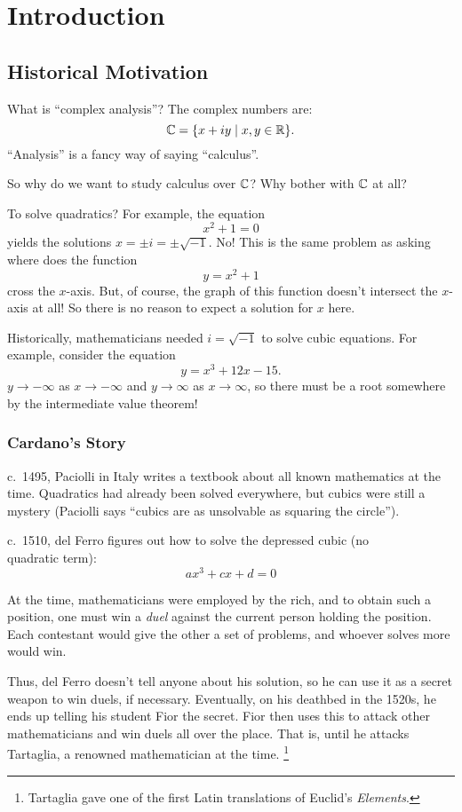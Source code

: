\chapter{Introduction}
\section{Historical Motivation}
What is ``complex analysis''? The complex numbers are:
\[
  \mathbb{C} = \{x + iy \mid x, y \in \mathbb{R}\}
.\] 
``Analysis'' is a fancy way of saying ``calculus''.

So why do we want to study calculus over $\mathbb{C}$?
Why bother with $\mathbb{C}$ at all?

To solve quadratics? For example, the equation
\[x^2 + 1 = 0\]
yields the solutions $x = \pm i = \pm \sqrt{-1}$. No!
This is the same problem as asking where does the
function
\[y = x^2 + 1\]
cross the $x$-axis. But, of course, the graph of this
function doesn't intersect the $x$-axis at all! So there
is no reason to expect a solution for $x$ here.

Historically, mathematicians needed $i = \sqrt{-1}$
to solve cubic equations.
For example, consider the equation
\[y = x^3 + 12x - 15.\]
$y \to -\infty$ as $x \to -\infty$ and $y \to \infty$
as $x \to \infty$, so there must be a root somewhere by
the intermediate value theorem!

\subsection{Cardano's Story}
c.~1495, Paciolli in Italy writes a textbook about all
known mathematics at the time. Quadratics had already
been solved everywhere, but cubics were still a mystery
(Paciolli says ``cubics are as unsolvable as squaring
the circle'').

c.~1510, del Ferro figures out how to
solve the depressed cubic (no \\ quadratic term):
\[ax^3 + cx + d = 0\]

At the time, mathematicians were employed by the rich,
and to obtain such a position, one must win a
\textit{duel} against the current person holding the
position. Each contestant would give the other a set
of problems, and whoever solves more would win.

Thus, del Ferro doesn't tell anyone about his solution,
so he can use it as a secret weapon to win duels, if
necessary. Eventually, on his deathbed in the
1520s, he ends up telling his student Fior the secret.
Fior then
uses this to attack other mathematicians and win duels
all over the place. That is, until he attacks Tartaglia,
a renowned mathematician at the time.
\footnote{Tartaglia gave one of the first Latin
translations of Euclid's \textit{Elements}.}

